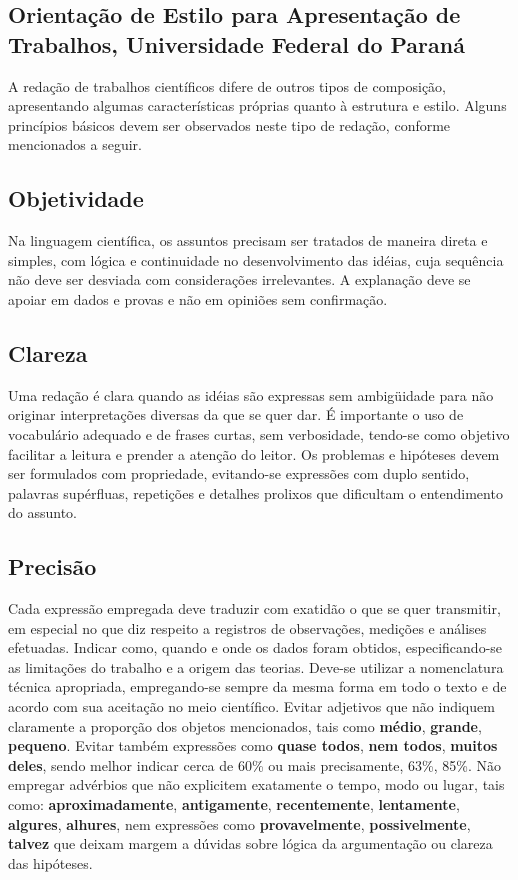 \documentclass[repeatfields,xlists,xpacks,oneside,yearsonly]{ufrgscca}
\begin{document}
\begin{annex}


\chapter{Orientação de Estilo para Apresentação de Trabalhos, Universidade Federal do Paraná}

A redação de trabalhos científicos difere de outros tipos de composição,
apresentando algumas características próprias quanto à estrutura e estilo.
Alguns princípios básicos devem ser observados neste tipo de redação,
conforme mencionados a seguir.

\section{Objetividade}

Na linguagem científica, os assuntos precisam ser tratados de maneira direta
e simples, com lógica e continuidade no desenvolvimento das idéias, cuja
sequência não deve ser desviada com considerações irrelevantes. A explanação
deve se apoiar em dados e provas e não em opiniões sem confirmação.

\section{Clareza}

Uma redação é clara quando as idéias são expressas sem ambigüidade para não
originar interpretações diversas da que se quer dar. É importante o uso de
vocabulário adequado e de frases curtas, sem verbosidade, tendo-se como
objetivo facilitar a leitura e prender a atenção do leitor. Os problemas e
hipóteses devem ser formulados com propriedade, evitando-se expressões com
duplo sentido, palavras supérfluas, repetições e detalhes prolixos que
dificultam o entendimento do assunto.

\section{Precisão}

Cada expressão empregada deve traduzir com exatidão o que se quer
transmitir, em especial no que diz respeito a registros de observações,
medições e análises efetuadas. Indicar como, quando e onde os dados foram
obtidos, especificando-se as limitações do trabalho e a origem das teorias.
Deve-se utilizar a nomenclatura técnica apropriada, empregando-se sempre da
mesma forma em todo o texto e de acordo com sua aceitação no meio
científico. Evitar adjetivos que não indiquem claramente a proporção dos
objetos mencionados, tais como {\bf médio}, {\bf grande}, {\bf pequeno}.
Evitar também expressões como {\bf quase todos}, {\bf nem todos}, {\bf
muitos deles}, sendo melhor indicar cerca de 60\% ou mais precisamente,
63\%, 85\%. Não empregar advérbios que não explicitem exatamente o tempo,
modo ou lugar, tais como: {\bf aproximadamente}, {\bf antigamente}, {\bf
recentemente}, {\bf lentamente}, {\bf algures}, {\bf alhures}, nem
expressões como {\bf provavelmente}, {\bf possivelmente}, {\bf talvez} que
deixam margem a dúvidas sobre lógica da argumentação ou clareza das
hipóteses.


\end{annex}
\end{document}
